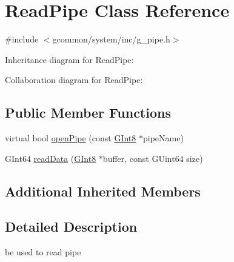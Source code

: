 \hypertarget{class_read_pipe}{\section{Read\-Pipe Class Reference}
\label{class_read_pipe}
}


{\ttfamily \#include $<$gcommon/system/inc/g\-\_\-pipe.\-h$>$}



Inheritance diagram for Read\-Pipe\-:


Collaboration diagram for Read\-Pipe\-:
\subsection*{Public Member Functions}
\begin{DoxyCompactItemize}
\item 
virtual bool \hyperlink{class_read_pipe_a61b8f2e60b4feed41baf3b262275b637}{open\-Pipe} (const \hyperlink{g__type_8h_ad1732c0e4cf5d108f232e44a1179e8b0}{G\-Int8} $\ast$pipe\-Name)
\item 
G\-Int64 \hyperlink{class_read_pipe_acd4e343d5753b703c1a5d85f0d9b6e52}{read\-Data} (\hyperlink{g__type_8h_ad1732c0e4cf5d108f232e44a1179e8b0}{G\-Int8} $\ast$buffer, const G\-Uint64 size)
\end{DoxyCompactItemize}
\subsection*{Additional Inherited Members}


\subsection{Detailed Description}
be used to read pipe 

